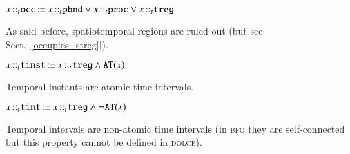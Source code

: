 \documentclass[ao]{iosart2x}
\newcommand{\nb}[1]{\textcolor{red}{$|$}\marginpar{\hspace*{-0cm}\parbox{20mm}{\scriptsize\raggedright\textcolor{red}{#1}}}}
\newcommand{\bfoAxLabel}{\textrm{a$_\texttt{b}$}}
\newcommand{\dbDefLabel}{\textrm{d$_\texttt{db}$}}
\newcounter{cntdbdf}
\newcommand{\dbdf}[1]{\refstepcounter{cntdbdf}\begin{small}{\bf \dbDefLabel\thecntdbdf\label{#1}}\end{small}}
\newcommand{\refbfoax}[1]{({\bfoAxLabel}\ref{#1})}
\newcommand{\pr}[1]{\mathtt{#1}}
\newcommand{\cn}[1]{\mathtt{#1}}
\newcommand\textequal{%
 \rule[.08ex]{5pt}{0.35pt}\llap{\rule[.78ex]{5pt}{0.35pt}}}
\newcommand{\sdef}{{\hspace{1.5pt}:\hspace{-2.5pt}\textequal\hspace{3pt}}}
\newcommand{\dolce}{{\textsc{dolce}}}
\newcommand{\bfo}{{\textsc{bfo}}}
\newcommand {\Tdcat} {\textsc{t}}
\newcommand {\ATd} {\ensuremath{\pr{AT}}}
\newcommand{\occbcat}{\cn{occ}}
\newcommand{\procbcat}{\cn{proc}}
\newcommand{\pbndbcat}{\cn{pbnd}}
\newcommand{\tregbcat}{\cn{treg}}
\newcommand{\stregbcat}{\cn{streg}}
\newcommand{\tinstbcat}{\cn{tinst}}
\newcommand{\tintbcat}{\cn{tint}}
\newcommand{\bfoexist}{\pr{EX}}
\newcommand{\bfoiof}[1]{{\,::_{#1\:\!}}}
\begin{document}
%
%
%

\item[\dbdf{d2b_occ}] $x \bfoiof{t} \occbcat \sdef x \bfoiof{t} \pbndbcat \lor x \bfoiof{t} \procbcat \lor x \bfoiof{t} \tregbcat$

\vspace{1pt}
As said before, spatiotemporal regions are ruled out (but see Sect.~\ref{occupies_streg}\nb{FC: sezione vecchia?}).

%

\item[\dbdf{d2b_tinst}]  $x \bfoiof{t} \tinstbcat \sdef x \bfoiof{t} \tregbcat \land \ATd(x)$

\vspace{1pt}
Temporal instants are atomic time intervals.

% 

\item[\dbdf{d2b_tint}] $x \bfoiof{t} \tintbcat \sdef x \bfoiof{t} \tregbcat \land \neg\ATd(x)$

\vspace{1pt}
Temporal intervals are non-atomic time intervals (in {\bfo} they are self-connected but this property cannot be defined in {\dolce}).
\end{document}
